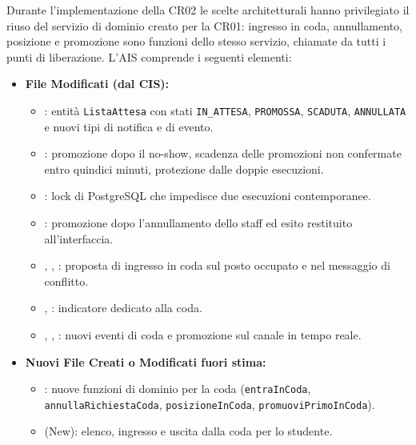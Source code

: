 \documentclass[11pt,a4paper,oneside,openany]{book}
\begin{document}
Durante l'implementazione della CR02 le scelte architetturali hanno
privilegiato il riuso del servizio di dominio creato per la CR01: ingresso in
coda, annullamento, posizione e promozione sono funzioni dello stesso
servizio, chiamate da tutti i punti di liberazione. L'AIS comprende i
seguenti elementi:
\begin{itemize}
  \item \textbf{File Modificati (dal CIS):}
  \begin{itemize}
    \item {}: entità \texttt{ListaAttesa} con stati
          \texttt{IN\_ATTESA}, \texttt{PROMOSSA}, \texttt{SCADUTA},
          \texttt{ANNULLATA} e nuovi tipi di notifica e di evento.
    \item {}: promozione dopo il no-show,
          scadenza delle promozioni non confermate entro quindici minuti,
          protezione dalle doppie esecuzioni.
    \item {}: lock di PostgreSQL che
          impedisce due esecuzioni contemporanee.
    \item {}: promozione dopo
          l'annullamento dello staff ed esito restituito all'interfaccia.
    \item {}, ,
          : proposta di ingresso in coda sul posto
          occupato e nel messaggio di conflitto.
    \item {},
          : indicatore dedicato alla
          coda.
    \item {}, ,
          : nuovi eventi di coda e promozione sul canale
          in tempo reale.
  \end{itemize}
  \item \textbf{Nuovi File Creati o Modificati fuori stima:}
  \begin{itemize}
    \item {}: nuove funzioni di
          dominio per la coda (\texttt{entraInCoda},
          \texttt{annullaRichiestaCoda}, \texttt{posizioneInCoda},
          \texttt{promuoviPrimoInCoda}).
    \item {} (New): elenco, ingresso e
          uscita dalla coda per lo studente.

\end{itemize}
\end{itemize}
\end{document}
